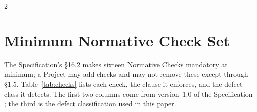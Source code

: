 \begin{multicols}{2}
\section{Minimum Normative Check Set}
\label{app:checks}
\setcounter{table}{0}
\setcounter{figure}{0}

The Specification's \hyperlink{nss-16.2}{\S16.2} makes sixteen Normative Checks mandatory at minimum; a Project may add checks and may not remove these except through \S1.5. Table~\ref{tab:checks} lists each check, the clause it enforces, and the defect class it detects. The first two columns come from version~1.0 of the Specification \citep[Section~\hyperlink{nss-16.2}{16.2}]{pss2026}; the third is the defect classification used in this paper.
\end{multicols}

